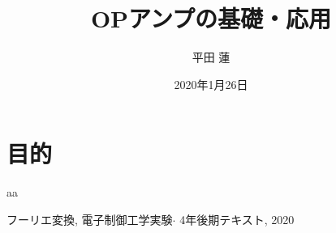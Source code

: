 \documentclass[titlepage]{jsarticle}
\title{OPアンプの基礎・応用}
\author{平田 蓮}
\date{2020年1月26日}
\begin{document}
\maketitle
\section{目的}
    aa
    
\begin{thebibliography}{99}
     フーリエ変換, 電子制御工学実験$\cdot$ 4年後期テキスト, 2020
\end{thebibliography}
\end{document}
